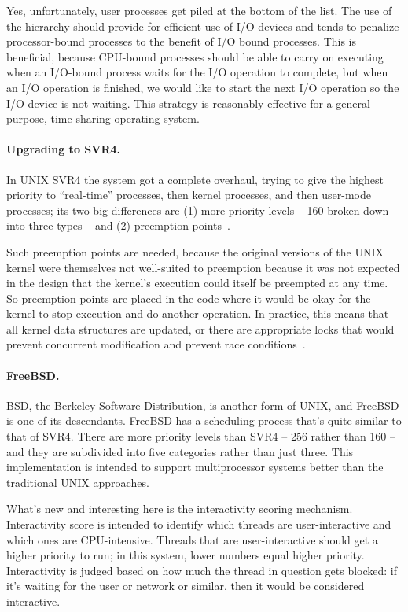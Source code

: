 Yes, unfortunately, user processes get piled at the bottom of the list. The use of the hierarchy should provide for efficient use of I/O devices and tends to penalize processor-bound processes to the benefit of I/O bound processes. This is beneficial, because CPU-bound processes should be able to carry on executing when an I/O-bound process waits for the I/O operation to complete, but when an I/O operation is finished, we would like to start the next I/O operation so the I/O device is not waiting. This strategy is reasonably effective for a general-purpose, time-sharing operating system.

\paragraph{Upgrading to SVR4.}
In UNIX SVR4 the system got a complete overhaul, trying to give the highest priority to ``real-time'' processes, then kernel processes, and then user-mode processes; its two big differences are (1) more priority levels -- 160 broken down into three types -- and (2) preemption points~\cite{osi}. 

Such preemption points are needed, because the original versions of the UNIX kernel were themselves not well-suited to preemption because it was not expected in the design that the kernel's execution could itself be preempted at any time. So preemption points are placed in the code where it would be okay for the kernel to stop execution and do another operation. In practice, this means that all kernel data structures are updated, or there are appropriate locks that would prevent concurrent modification and prevent race conditions~\cite{osi}. 

\paragraph{FreeBSD.}
BSD, the Berkeley Software Distribution, is another form of UNIX, and FreeBSD is one of its descendants. FreeBSD has a scheduling process that's quite similar to that of SVR4. There are more priority levels than SVR4 -- 256 rather than 160 -- and they are subdivided into five categories rather than just three. This implementation is intended to support multiprocessor systems better than the traditional UNIX approaches.

What's new and interesting here is the interactivity scoring mechanism. Interactivity score is intended to identify which threads are user-interactive and which ones are CPU-intensive. Threads that are user-interactive should get a higher priority to run; in this system, lower numbers equal higher priority. Interactivity is judged based on how much the thread in question gets blocked: if it's waiting for the user or network or similar, then it would be considered interactive.

